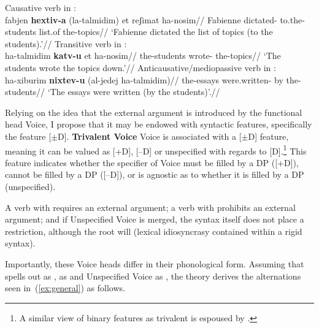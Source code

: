 \pex\label{ex:general}
	\a Causative verb in {\thif}:\\
		\begingl
		\gla fabjen \textbf{hextiv-a} (la-talmidim) et reʃimat ha-nosim//
		\glb Fabienne dictated- to.the-students  list.of the-topics//
		\glft `Fabienne dictated the list of topics (to the students).'//
	\endgl	
	\a Transitive verb in {\tkal}:\\
		\begingl
		\gla ha-talmidim \textbf{katv-u} et ha-nosim//
		\glb the-students wrote-  the-topics//
		\glft `The students wrote the topics down.'//
	\endgl
	\a Anticausative/mediopassive verb in {\tnif}:\\
		\begingl
		\gla ha-xiburim \textbf{nixtev-u} (al-jedej ha-talmidim)//
		\glb the-essays were.written- by the-students//
		\glft `The essays were written (by the students)'.//
	\endgl
\xe

Relying on the idea that the external argument is introduced by the functional head Voice, I propose that it may be endowed with syntactic features, specifically the feature [$\pm$D].
\pex \textbf{Trivalent Voice}
	\a Voice is associated with a [$\pm$D] feature, meaning it can be valued as [+D], [--D] or unspecified with regards to [D].\footnote{A similar view of binary features as trivalent is espoused by \cite{harbour11}.}
	\a This feature indicates whether the specifier of Voice must be filled by a DP ([+D]), cannot be filled by a DP ([--D]), or is agnostic as to whether it is filled by a DP (unspecified).
\xe

A verb with {\vd} requires an external argument; a verb with {\vz} prohibits an external argument; and if Unspecified Voice is merged, the syntax itself does not place a restriction, although the root will (lexical idiosyncrasy contained within a rigid syntax).

Importantly, these Voice heads differ in their phonological form. Assuming that {\vd} spells out as {\thif}, {\vz} as {\tnif} and Unspecified Voice as {\tkal}, the theory derives the alternations seen in~(\ref{ex:general}) as follows.

\ex\label{ex:alternations-heb}
\xe


